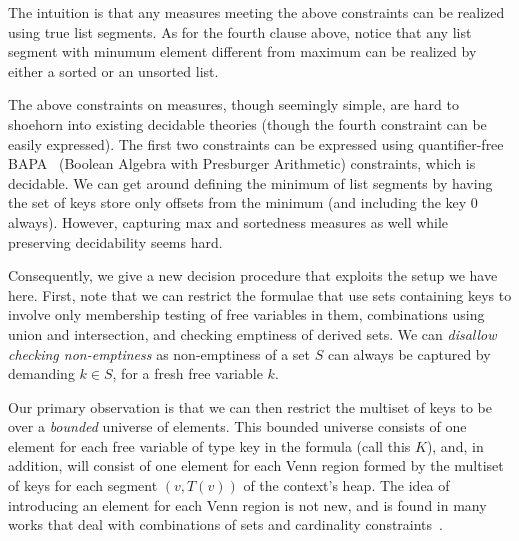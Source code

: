 The intuition is that any measures meeting the above constraints can be realized using true list
segments. As for the fourth clause above, notice that any list segment with minumum element different
from maximum can be realized by either a sorted or an unsorted list.

The above constraints on measures, though seemingly simple, are hard to shoehorn into existing decidable theories
(though the fourth constraint can be easily expressed).
The first two constraints can be expressed using quantifier-free BAPA~\cite{BAPA} (Boolean Algebra with Presburger
Arithmetic) constraints, which is decidable. We can get around defining the minimum of list segments
by having the set of keys store only offsets from the minimum (and including the key $0$ always). However,
capturing max and sortedness measures as well while preserving decidability seems hard.

Consequently, we give a new decision procedure that exploits the setup we have here.
First, note that we can restrict the formulae that use sets containing keys to involve
only membership testing of free variables in them, combinations using union and intersection,
and checking emptiness of derived sets. We can \emph{disallow checking non-emptiness} as non-emptiness
of a set $S$ can always be captured by demanding $k \in S$, for a fresh free variable $k$.


Our primary observation is that we can then restrict the multiset of keys to be over a \emph{bounded}
universe of elements. This bounded universe consists of one element for each free variable of type key 
in the formula (call this $K$), and, in addition, will consist of one element for each Venn region formed by the multiset
of keys for each segment $(v,T(v))$ of the context's heap. The idea of introducing an element for each Venn
region is not new, and is found in many works that deal with combinations of sets and cardinality constraints~\cite{BAPA}.


